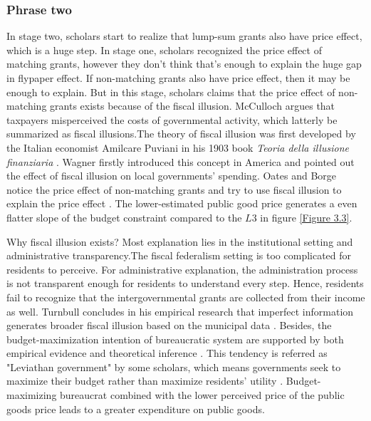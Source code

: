 \subsubsection{Phrase two}

In stage two, scholars start to realize that lump-sum grants also have price effect, which is a huge step. In stage one, scholars recognized the price effect of matching grants, however they don’t think that’s enough to explain the huge gap in flypaper effect. If non-matching grants also have price effect, then it may be enough to explain. But in this stage, scholars claims that the price effect of non-matching grants exists because of the fiscal illusion. McCulloch \cite{mcculloch1845treatise} argues that taxpayers misperceived  the costs of governmental activity, which latterly be summarized as fiscal illusions.The theory of fiscal illusion was first developed by the Italian economist Amilcare Puviani in his 1903 book \textit{Teoria della illusione finanziaria} \cite{puviani1903teoria}. Wagner \cite{wagner1976revenue} firstly introduced this concept in America and pointed out the effect of fiscal illusion on local governments' spending. Oates and Borge notice the price effect of non-matching grants and try to use fiscal illusion to explain the price effect \cite{oates1979lump,borge1995lump}. The lower-estimated public good price generates a even flatter slope of the budget constraint compared to the $L3$ in figure \ref{Figure 3.3}.

Why fiscal illusion exists? Most explanation lies in the institutional setting and administrative transparency.The fiscal federalism setting is too complicated for residents to perceive. For administrative explanation, the administration process is not transparent enough for residents to understand every step. Hence, residents fail to recognize that the intergovernmental grants are collected from their income as well. Turnbull concludes in his empirical research that imperfect information generates broader fiscal illusion based on the municipal data \cite{turnbull1998overspending}. Besides, the budget-maximization intention of bureaucratic system are supported by both empirical evidence and theoretical inference \cite{mueller2003public,brennan1977towards}. This tendency is referred as "Leviathan government" by some scholars, which means governments seek to maximize their budget rather than maximize residents' utility \cite{quigley1986budget}. Budget-maximizing bureaucrat combined with the lower perceived price of the public goods price leads to a greater expenditure on public goods.

